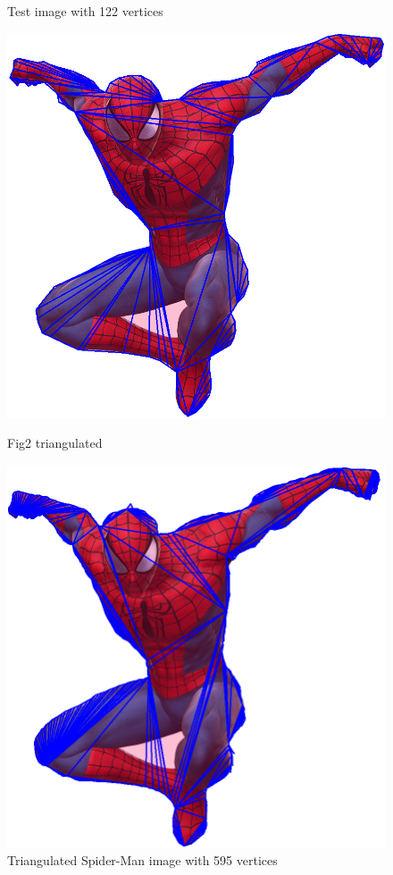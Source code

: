\documentclass[conference]{IEEEtran}
\begin{document}
\begin{figure}
    \caption{Test image with 122 vertices}
    \label{fig:test122}
     \centering
    \includegraphics[scale=0.2]{spidermanTriangulated}
    \caption{Fig2 triangulated}
    \label{fig:test122T}
    \centering
    \includegraphics[scale=0.2]{spiderman595Triangulated}
    \caption{Triangulated Spider-Man image with 595 vertices}
    \label{fig:test595}
\end{figure}
\end{document}
